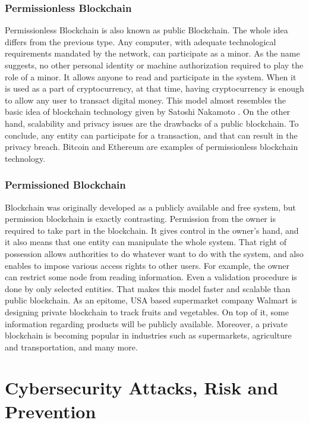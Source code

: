 \documentclass[a4paper,twoside,12pt]{report}
\begin{document}
\begin{spacing}{1.5}
\subsection{Permissionless Blockchain}
Permissionless Blockchain is also known as public Blockchain. The whole idea differs from the previous type. Any computer, with adequate technological requirements mandated by the network, can participate as a minor. As the name suggests, no other personal identity or machine authorization required to play the role of a minor. It allows anyone to read and participate in the system. When it is used as a part of cryptocurrency, at that time, having cryptocurrency is enough to allow any user to transact digital money. This model almost resembles the basic idea of blockchain technology given by Satoshi Nakamoto \cite{satoshinakamoto}. On the other hand, scalability and privacy issues are the drawbacks of a public blockchain. To conclude, any entity can participate for a transaction, and that can result in the privacy breach. Bitcoin and Ethereum are examples of permissionless blockchain technology. 
\subsection{Permissioned Blockchain}
Blockchain was originally developed as a publicly available and free system, but permission blockchain is exactly contrasting. Permission from the owner is required to take part in the blockchain. It gives control in the owner's hand, and it also means that one entity can manipulate the whole system. That right of possession allows authorities to do whatever want to do with the system, and also enables to impose various access rights to other users. For example, the owner can restrict some node from reading information. Even a validation procedure is done by only selected entities. That makes this model faster and scalable than public blockchain. As an epitome, USA based supermarket company Walmart is designing private blockchain to track fruits and vegetables. On top of it, some information regarding products will be publicly available. Moreover, a private blockchain is becoming popular in industries such as supermarkets, agriculture and transportation, and many more.
\chapter{Cybersecurity Attacks, Risk and Prevention}
\label{chapter3}

\end{spacing}
\end{document}
